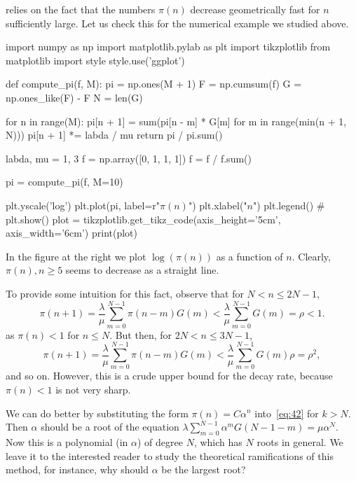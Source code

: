  relies on the fact that the numbers $\pi(n)$ decrease geometrically fast for $n$ sufficiently large.
Let us check this for the numerical example we studied above.
\begin{marginfigure}
\begin{pycode}[ignore]
import numpy as np
import matplotlib.pylab as plt
import tikzplotlib
from matplotlib import style
style.use('ggplot')

def compute_pi(f, M):
    pi = np.ones(M + 1)
    F = np.cumsum(f)
    G = np.ones_like(F) - F
    N = len(G)

    for n in range(M):
        pi[n + 1] = sum(pi[n - m] * G[m] for m in range(min(n + 1, N)))
        pi[n + 1] *= labda / mu
    return pi / pi.sum()

labda, mu = 1, 3
f = np.array([0, 1, 1, 1])
f = f / f.sum()

pi = compute_pi(f, M=10)


plt.yscale('log')
plt.plot(pi, label=r"$\pi(n)$")
plt.xlabel("$n$")
plt.legend()
# plt.show()
plot = tikzplotlib.get_tikz_code(axis_height='5cm', axis_width='6cm')
print(plot)
\end{pycode}
\end{marginfigure}
In the figure at the right we plot $\log (\pi(n))$  as a function of $n$. Clearly, $\pi(n), n\geq 5$ seems to decrease as a straight line.


To provide some intuition for this fact, observe that  for $N<n\leq 2N-1$, 
\begin{equation*}
  \pi(n+1) = \frac{\lambda}{\mu} \sum_{m=0}^{N-1}\pi(n-m)G(m) < \frac{\lambda}{\mu} \sum_{m=0}^{N-1} G(m)  = \rho < 1.
\end{equation*}
as $\pi(n) < 1$ for $n\leq N$. But then, for $2N< n \leq 3N-1$, 
\begin{equation*}
  \pi(n+1) = \frac{\lambda}{\mu} \sum_{m=0}^{N-1}\pi(n-m)G(m) < \frac{\lambda}{\mu} \sum_{m=0}^{N-1} G(m)\rho  = \rho^2,
\end{equation*}
and so on. However, this is a crude upper bound for the decay rate, because $\pi(n)<1$ is not very sharp. 

We can do better by substituting the form $\pi(n)= C \alpha^n$ into~\cref{eq:42} for $k>N$.
Then $\alpha$ should be a root of the equation $\lambda \sum_{m=0}^{N-1} \alpha^m G(N-1-m) = \mu \alpha^{N}$.
Now this is a polynomial (in $\alpha$) of degree $N$, which has $N$ roots in general.
We leave it to the interested reader to study the theoretical ramifications of this method, for instance, why should $\alpha$ be the largest root? 


